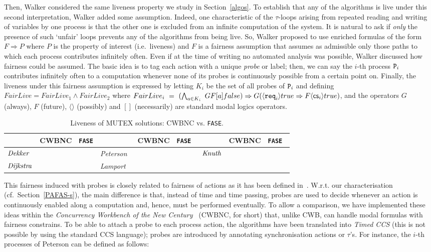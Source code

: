 \documentclass[copyright,creativecommons]{eptcs}
\newcommand{\fase}{\texttt{FASE}}
\newcommand{\checky}{\ding{51}}
\newcommand{\checkn}{\ding{55}}
\newcommand{\req}{{\tt req}}
\newcommand{\cs}{{\sf cs}}
\newcommand{\dekker}{{\it Dekker}}
\newcommand{\dijkstra}{{\it Dijkstra}}
\newcommand{\knuth}{{\it Knuth}}
\newcommand{\peterson}{{\it Peterson}}
\newcommand{\lamport}{{\it Lamport}}
\newcommand{\proc}{{\tt P}}
\begin{document}
Then, Walker considered the same liveness property we study in
Section~\ref{algos}. To establish that any of the algorithms is live under
this second interpretation, Walker added some assumption. Indeed,
one characteristic of the $\tau$-loops arising from repeated reading and
writing of variables by one process is that the other one is excluded from
an infinite computation of the system. It is natural to ask if {\em
only} the presence of such `unfair' loops prevents any of the
algorithms from being live. So, Walker proposed to use enriched formulas
of the form $F \Rightarrow P$ where $P$ is the property of interest (i.e.\
liveness) and $F$ is a fairness assumption that assumes as admissible
only those paths to which each process contributes infinitely often. 
Even if at the time of writing no automated analysis was possible, Walker
discussed how fairness could be assumed. The basic idea  is to tag
each action with a unique {\em probe} or label; then, we can say the $i$-th
process $\proc_i$ contributes infinitely often to a computation whenever
none of its probes is continuously possible from a certain point on.
Finally, the liveness under this fairness
assumption is expressed by letting $K_i$ be the set of all probes of
$\proc_i$ and defining  $FairLive = FairLive_1 \wedge FairLive_2$
where 
$FairLive_i\ =\ (\bigwedge_{a \in K_{i}}\ GF[a] false) \Rightarrow
G(\langle\req_i\rangle true  \Rightarrow F\langle\cs_i\rangle true)$,
and the operators $G$ (always), $F$ (future), $\langle\rangle$ (possibly)
and $[]$ (necessarily) are standard modal logics operators.

\begin{table}
\centering
\small
\begin{tabular}{l c c l c c l c c}
 & CWBNC & \fase & &  CWBNC & \fase\  & &  CWBNC & \fase\  \\ \hline
\midrule
$\dekker$ & \checkn\ & \checky\ & \peterson\ & \checkn\ & \checky\
& $\knuth$ & \checkn\ & \checkn\ \\
$\dijkstra$ & \checkn\ & \checkn\ & \lamport\ & \checkn\ & \checkn\ \\
\midrule
\end{tabular}
\caption{Liveness of MUTEX solutions: CWBNC vs. \fase.}
\label{tab:comparing2}
\end{table}

This fairness induced with probes is closely related to fairness of actions
as it has been defined in~\cite{CostaS84,CostaS87}. W.r.t. our
characterisation (cf.\ Section~\ref{PAFAS-s}),  the  main difference is
that, instead of time and time passing, probes are used to decide whenever
an action is continuously enabled along a computation and, hence, must be
performed eventually. To allow a comparison, we have implemented these
ideas within the {\em Concurrency Workbench of the New
Century}~\cite{CLS00} (CWBNC, for short) that, unlike CWB, can handle modal
formulas with fairness constrains. To be able to attach a probe to each
process action, the algorithms have been translated into {\em Timed CCS}
(this is not possible by using the standard CCS language); probes are
introduced by annotating synchronisation actions or $\tau$'s. For instance,
the $i$-th processes of Peterson can be defined as follows:
\end{document}
